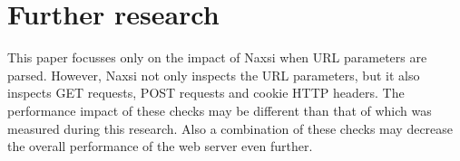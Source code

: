 \documentclass[Further research]{subfiles}
\begin{document}
\section{Further research}
\label{sec:Further research}

This paper focusses only on the impact of Naxsi when \ac{URL} parameters are parsed. However, Naxsi not only inspects the \ac{URL} parameters, but it also inspects GET requests, POST requests and cookie HTTP headers. The performance impact of these checks may be different than that of which was measured during this research. Also a combination of these checks may decrease the overall performance of the web server even further.
\end{document}
